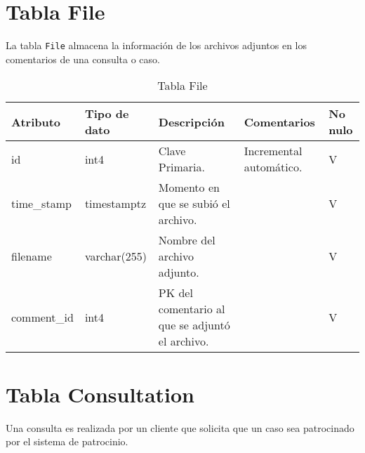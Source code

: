 \section{Tabla File}\label{sec:table-file}
La tabla \texttt{File} almacena la información de los archivos adjuntos en los comentarios de una consulta o caso.

\begin{table}[H]
\centering
\label{tab:file}
\begin{tabular}{|p{3cm}|p{2.5cm}|p{4.5cm}|p{4cm}|p{1cm}|}
\hline
\textbf{Atributo} & \textbf{Tipo de dato}  & \textbf{Descripción} & \textbf{Comentarios} & \textbf{No nulo} \\ \hline
id & int4 & Clave Primaria. & Incremental automático. & V \\ \hline
time\_stamp & timestamptz & Momento en que se subió el archivo. &  & V \\ \hline
filename & varchar(255) & Nombre del archivo adjunto. &  & V \\ \hline
comment\_id & int4 & PK del comentario al que se adjuntó el archivo. &  & V \\ \hline
\end{tabular}
\caption{Tabla File}
\end{table}


\section{Tabla Consultation}\label{sec:table-consultation}
Una consulta es realizada por un cliente que solicita que un caso sea patrocinado por el sistema de patrocinio.

